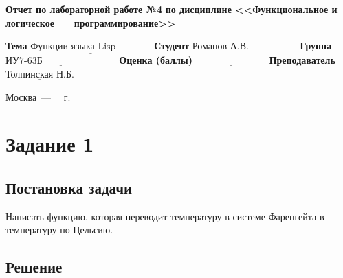 \documentclass[12pt]{report}
\begin{document}
\begin{titlepage}
		\begin{center}
			\noindent\begin{minipage}{1.1\textwidth}\centering
				\Large\textbf{  Отчет по лабораторной работе №4}\newline
				\textbf{по дисциплине <<Функциональное и логическое}\newline
				\textbf{~~~программирование>>}\newline\newline
			\end{minipage}
		\end{center}
		
		\noindent\textbf{Тема} $\underline{\text{Функции языка Lisp~~~~~~~~~~~}}$\newline\newline
		\noindent\textbf{Студент} $\underline{\text{Романов А.В.~~~~~~~~~~~~~~~}}$\newline\newline
		\noindent\textbf{Группа} $\underline{\text{ИУ7-63Б~~~~~~~~~~~~~~~~~~~~~~~}}$\newline\newline
		\noindent\textbf{Оценка (баллы)} $\underline{\text{~~~~~~~~~~~~~~~~~~~~~~}}$\newline\newline
		\noindent\textbf{Преподаватель} $\underline{\text{Толпинская Н.Б.}}$\newline\newline\newline
		
	\begin{center}
		\vfill
		Москва~---~\the\year
		~г.
	\end{center}
\end{titlepage}
	
	
	
\section*{Задание 1}
\subsection*{Постановка задачи}
	
Написать функцию, которая переводит температуру в системе Фаренгейта в температуру по Цельсию.
	
\subsection*{Решение}
\end{document}
